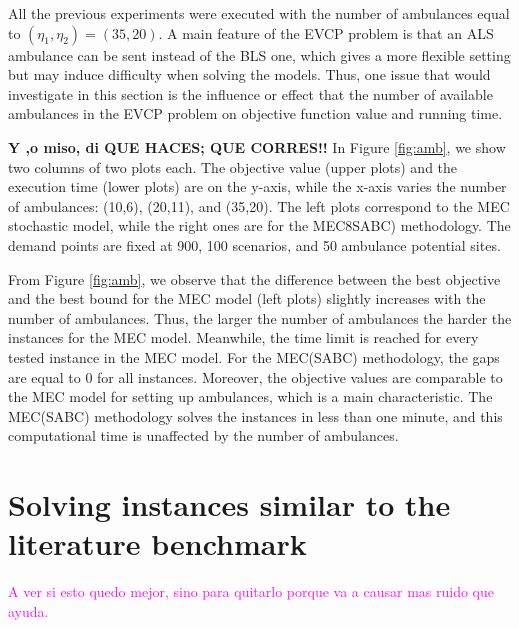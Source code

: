  All the previous experiments were executed with the number of ambulances equal to $(\eta_1,\eta_2)=   (35,20) $. A main feature of the EVCP problem is that an ALS ambulance can be sent instead of the BLS one, which gives a more flexible setting but may induce difficulty when solving the models. 
 Thus, one issue that would investigate in this section is the influence or effect that the number of available ambulances in the EVCP problem on objective function value and running time.

 \textbf{Y ,o miso, di QUE HACES; QUE CORRES!!
 }
 In Figure \ref{fig:amb}, we show two columns of two plots each.  The objective value (upper plots) and the execution time (lower plots) are on the y-axis, while the x-axis varies the number of ambulances: (10,6), (20,11), and  (35,20). The left plots correspond to the MEC stochastic model, while the right ones are for the MEC8SABC) methodology. The demand points are fixed at 900, 100 scenarios, and 50 ambulance potential sites. 

 From Figure \ref{fig:amb}, we observe that the difference between the best objective and the best bound for the MEC model (left plots) slightly increases with the number of ambulances. Thus, the larger the number of ambulances the harder the instances for the MEC model. Meanwhile, the time limit is reached for every tested instance in the MEC model. For the MEC(SABC) methodology, the gaps are equal to 0 for all instances. Moreover, the objective values are comparable to the MEC model for setting up ambulances, which is a main characteristic. The MEC(SABC) methodology solves the instances in less than one minute, and this computational time is unaffected by the number of ambulances. %


 
\section{Solving instances similar to the literature benchmark} \label{benchmark}

\textcolor{magenta}{A ver si esto quedo mejor, sino para quitarlo porque va a causar mas ruido que ayuda.}

